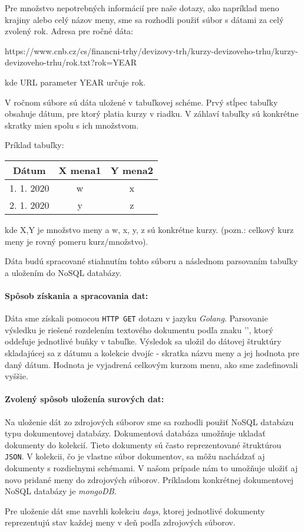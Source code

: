 \documentclass[]{article}
\begin{document}
   Pre množstvo nepotrebných informácií pre naše dotazy, ako napríklad meno krajiny alebo celý názov meny, sme sa rozhodli použiť súbor s dátami za celý zvolený rok. Adresa pre ročné dáta: 
\begin{center}
https://www.cnb.cz/cs/financni-trhy/devizovy-trh/kurzy-devizoveho-trhu/kurzy-devizoveho-trhu/rok.txt?rok=YEAR
\end{center}
kde URL parameter YEAR určuje rok.

V ročnom súbore sú dáta uložené v tabuľkovej schéme. Prvý stĺpec tabuľky obsahuje dátum, pre ktorý platia kurzy v riadku. V záhlaví tabuľky sú konkrétne skratky mien spolu s ich množstvom. 

\pagebreak

Príklad tabuľky:

\begin{center}
\begin{tabular}{ |c|c|c| } 
 \hline
 Dátum & X mena1 & Y mena2 \\ 
  \hline
 1. 1. 2020  & w & x \\ 
  \hline
 2. 1. 2020 & y & z \\ 
 \hline
\end{tabular}
\end{center}

kde X,Y je množstvo meny a w, x, y, z sú konkrétne kurzy. (pozn.: celkový kurz meny je rovný pomeru kurz/množstvo).

Dáta budú spracované stiahnutím tohto súboru a následnom parsovaním tabuľky a uložením do NoSQL databázy.

\paragraph{Spôsob získania a spracovania dat:} Dáta sme získali pomocou \texttt{HTTP GET} dotazu v jazyku \textit{Golang}.  Parsovanie výsledku je riešené rozdelením textového dokumentu podľa znaku '\textbar', ktorý oddeľuje jednotlivé buňky v tabuľke. Výsledok sa uložil do dátovej štruktúry skladajúcej sa z dátumu a kolekcie dvojíc - skratka názvu meny a jej hodnota pre daný dátum. Hodnota je vyjadrená celkovým kurzom menu, ako sme zadefinovali vyššie.


\paragraph{Zvolený spôsob uloženía surových dat:}

Na uloženie dát zo zdrojových súborov sme sa rozhodli použiť NoSQL databázu typu dokumentovej databázy. Dokumentová databáza umožňuje ukladať dokumenty do kolekcií. Tieto dokumenty sú často reprezentované štruktúrou \texttt{JSON}. V kolekcii, čo je vlastne súbor dokumentov, sa môžu nachádzať aj dokumenty s rozdielnymi schémami. V našom prípade nám to umožňuje uložiť aj novo pridané meny do zdrojových súborov.  Príkladom konkrétnej dokumentovej NoSQL databázy je \textit{mongoDB}. 

Pre uloženie dát sme navrhli kolekciu \textit{days}, ktorej jednotlivé dokumenty reprezentujú stav každej meny v deň podľa zdrojových súborov. 
\end{document}
